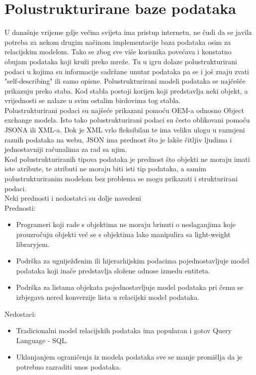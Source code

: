 \documentclass[a4paper,12pt]{foi}
\begin{document}
\chapter{Polustrukturirane baze podataka}
U današnje vrijeme gdje večina svijeta ima pristup internetu, ne čudi da se javila potreba za nekom drugim načinom implementacije baza podataka osim za relacijskim modelom. Tako se zbog sve više korisnika povećava i konstatno obujam podataka koji kruži preko mreže. Tu u igru dolaze polustrukturirani podaci u kojima su informacije sadržane unutar podataka pa se i još znaju zvati "self-describing" ili samo opisne. Polustrukturirani modeli podataka se najčešće prikazuju preko staba. Kod stabla postoji korijen koji predstavlja neki objekt, a vrijednosti se nalaze u svim ostalim birdovima tog stabla.\\
Polustrukturirani podaci su najšeće prikazani pomoću OEM-a odnosno Object exchange modela. Isto tako polustrukturirani podaci su često oblikovani pomoću JSONA ili XML-a. Dok je XML vrlo fleksibilan te ima veliku ulogu u razmjeni raznih podataka na webu, JSON ima prednost što je lakše čitljiv ljudima i jednostavniji računalima za rad sa njim.\\
Kod polustrukturiranih tipova podataka je prednost što objekti ne moraju imati iste atribute, te atributi ne moraju biti isti tip podataka, a samim polustrukturiranim modelom bez problema se mogu prikazati i strukturirani podaci.\\ Neki prednosti i nedostatci su dolje navedeni\\

Prednosti:
\begin{itemize}
\item Programeri koji rade s objektima ne moraju brinuti
o neslaganjima koje prouzročuju objekti
već se s objektima lako manipulira sa light-weight libraryjem.
\item Podrška za ugniježđenim ili hijerarhijskim podacima
pojednostavljuje model podataka koji inače predstavlja složene odnose izmedu entiteta.
\item Podrška za listama objekata pojednostavljuje
model podataka pri čemu se izbjegava nered
konverzije lista u relacijski model podataka.
\end{itemize}

Nedostaci:
\begin{itemize}
\item Tradicionalni model relacijskih podataka
ima popularan i gotov Query Language - SQL.\\
\item Uklanjanjem ograničenja iz modela podataka
sve se manje promišlja da je potrebno razraditi unos podataka.
\end{itemize}
\end{document}
